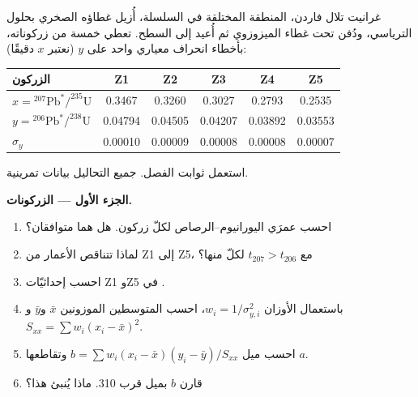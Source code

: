 \begin{problem}\label{pb:b3:advanced-geochronology:1}
غرانيت تلال فاردن، المنطقة المختلقة في السلسلة، أُزيل غطاؤه الصخري
بحلول الترياسي، ودُفن تحت غطاء الميزوزوي ثم أُعيد إلى السطح.
تعطي خمسة من زركوناته، بأخطاء انحراف معياري واحد على $y$
(نعتبر $x$ دقيقًا):
\begin{center}
\small
\begin{tabular}{|l|ccccc|}
\hline
الزركون & Z1 & Z2 & Z3 & Z4 & Z5 \\
\hline
$x = {}^{207}\mathrm{Pb}^*/^{235}\mathrm U$ & 0.3467 & 0.3260 & 0.3027 & 0.2793 & 0.2535 \\
$y = {}^{206}\mathrm{Pb}^*/^{238}\mathrm U$ & 0.04794 & 0.04505 & 0.04207 & 0.03892 & 0.03553 \\
$\sigma_y$ & 0.00010 & 0.00009 & 0.00008 & 0.00008 & 0.00007 \\
\hline
\end{tabular}
\end{center}
استعمل ثوابت الفصل. جميع التحاليل بيانات تمرينية.

\medskip\noindent\textbf{الجزء الأول --- الزركونات.}
\begin{enumerate}
\item احسب عمرَي اليورانيوم--الرصاص لكلّ زركون. هل هما متوافقان؟
\item لماذا تتناقص الأعمار من Z1 إلى Z5، مع $t_{207} > t_{206}$
لكلّ منها؟
\item احسب إحداثيّات Z1 وZ5 في .
\item باستعمال الأوزان $w_i = 1/\sigma_{y,i}^2$، احسب المتوسطين الموزونين
$\bar x$ و$\bar y$ و$S_{xx} = \sum w_i(x_i - \bar x)^2$.
\item احسب ميل  $b = \sum w_i(x_i - \bar x)(y_i - \bar y)/S_{xx}$
وتقاطعها $a$.
\item قارن $b$ بميل  قرب \qty{310}{\Ma}. ماذا
يُنبئ هذا؟
\end{enumerate}


\end{problem}
